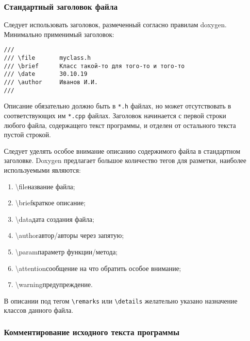 \subsubsection{Стандартный заголовок файла}

Следует использовать заголовок, размеченный согласно правилам doxygen. Минимально применимый заголовок:

\begin{lstlisting}[frame=single]
///
/// \file       myclass.h
/// \brief      Класс такой-то для того-то и того-то
/// \date       30.10.19
/// \author     Иванов И.И.
///
\end{lstlisting}

Описание обязательно должно быть в \lstinline|*.h| файлах, но может отсутствовать в соответствующих им \lstinline|*.cpp| файлах. Заголовок начинается с первой строки любого файла, содержащего текст программы, и отделен от остального текста пустой строкой.
 
Следует уделять особое внимание описанию содержимого файла в стандартном заголовке. 
Doxygen предлагает большое количество тегов для разметки, наиболее используемыми являются:
\begin{enumerate}
\item \textbackslash file\mdash название файла;
\item \textbackslash brief\mdash краткое описание;
\item \textbackslash data\mdash дата создания файла;
\item \textbackslash author\mdash автор/авторы через запятую;
\item \textbackslash param\mdash параметр функции/метода;
\item \textbackslash attention\mdash сообщение на что обратить особое внимание;
\item \textbackslash warning\mdash предупреждение.
\end{enumerate}

В описании под тегом \lstinline|\remarks| или \lstinline|\details| желательно указано назначение классов данного файла.

\newpage
\subsubsection{Комментирование исходного текста программы}

